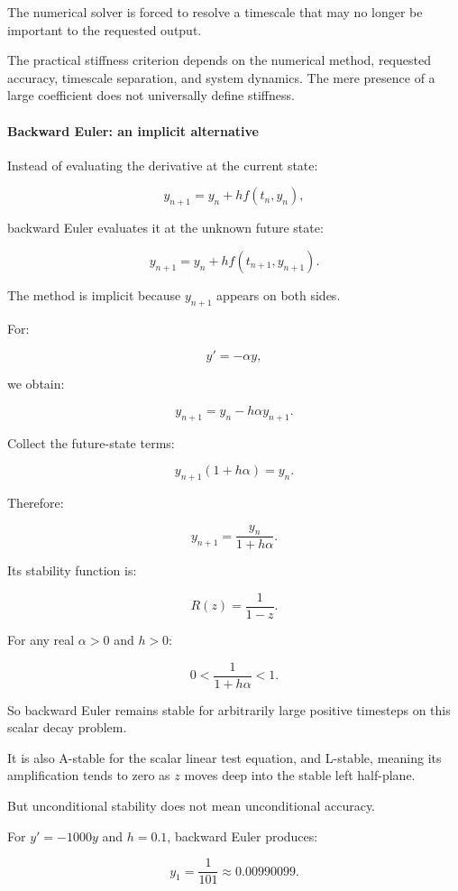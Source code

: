 The numerical solver is forced to resolve a timescale that may no longer be important to the requested output.

The practical stiffness criterion depends on the numerical method, requested accuracy, timescale separation, and system dynamics. The mere presence of a large coefficient does not universally define stiffness.

\paragraph{Backward Euler: an implicit alternative}\label{02-foundations-ii-ch025-backward-euler-an-implicit-alternative}

Instead of evaluating the derivative at the current state:

\[
y_{n+1}=y_n+hf(t_n,y_n),
\]

backward Euler evaluates it at the unknown future state:

\[
\boxed{ y_{n+1}=y_n+hf(t_{n+1},y_{n+1}) }.
\]

The method is implicit because \(y_{n+1}\) appears on both sides.

For:

\[
y'=-\alpha y,
\]

we obtain:

\[
y_{n+1}=y_n-h\alpha y_{n+1}.
\]

Collect the future-state terms:

\[
y_{n+1}(1+h\alpha)=y_n.
\]

Therefore:

\[
\boxed{ y_{n+1}=\frac{y_n}{1+h\alpha} }.
\]

Its stability function is:

\[
R(z)=\frac1{1-z}.
\]

For any real \(\alpha>0\) and \(h>0\):

\[
0<\frac1{1+h\alpha}<1.
\]

So backward Euler remains stable for arbitrarily large positive timesteps on this scalar decay problem.

It is also A-stable for the scalar linear test equation, and L-stable, meaning its amplification tends to zero as \(z\) moves deep into the stable left half-plane.

But unconditional stability does not mean unconditional accuracy.

For \(y'=-1000y\) and \(h=0.1\), backward Euler produces:

\[
y_1=\frac1{101}\approx0.00990099.
\]

